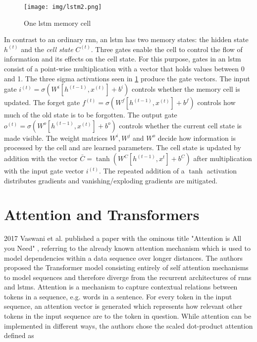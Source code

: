 \begin{figure}[h]
	\centering
	\texttt{[image: img/lstm2.png]}
	\caption{One \gls{lstm} memory cell \cite{rnn_zachary}}
	\label{fig:background:lstm}
\end{figure}

In contrast to an ordinary \gls{rnn}, an \gls{lstm} has two memory states: the hidden state $h^{(t)}$ and the \textit{cell state} $C^{(t)}$. Three gates enable the cell to control the flow of information and its effects on the cell state. For this purpose, gates in an \gls{lstm} consist of a point-wise multiplication with a vector that holds values between 0 and 1. The three sigma activations seen in \ref{fig:background:lstm} produce the gate vectors. The input gate $i^{(t)} = \sigma(W^i[h^{(t-1)},x^{(t)}] + b^i)$ controls whether the memory cell is updated. The forget gate $f^{(t)} = \sigma(W^f[h^{(t-1)},x^{(t)}] + b^f)$ controls how much of the old state is to be forgotten. The output gate $o^{(t)} = \sigma(W^o[h^{(t-1)},x^{(t)}] + b^o)$ controls whether the current cell state is made visible. The weight matrices $W^i, W^j$ and $W^o$ decide how information is processed by the cell and are learned parameters. The cell state is updated by addition with the vector $\bar{C}=\tanh(W^C[h^{(t-1)},x^{t}]+b^C)$ after multiplication with the input gate vector $i^{(t)}$. The repeated addition of a $\tanh$ activation distributes gradients and vanishing/exploding gradients are mitigated.

\section{Attention and Transformers}

2017 Vaswani et al. published a paper with the ominous title "Attention is All you Need" \cite{attention_origin}, referring to the already known attention mechanism which is used to model dependencies within a data sequence over longer distances. The authors proposed the Transformer model consisting entirely of self attention mechanisms to model sequences and therefore diverge from the recurrent architectures of \glspl{rnn} and \glspl{lstm}. Attention is a mechanism to capture contextual relations between tokens in a sequence, e.g. words in a sentence. For every token in the input sequence, an attention vector is generated which represents how relevant other tokens in the input sequence are to the token in question. While attention can be implemented in different ways, the authors chose the scaled dot-product attention defined as 

